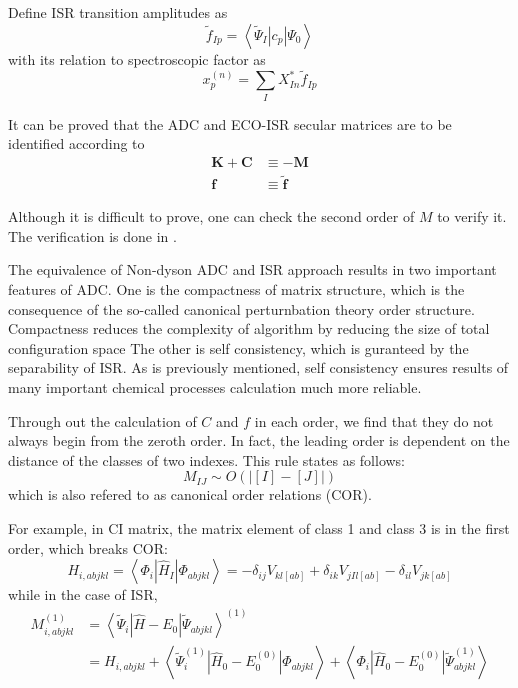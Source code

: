 \documentclass[bachelor, english]{ustcthesis}
\begin{document}
Define ISR transition amplitudes as
\begin{equation}
	\tilde{f}_{I p}=\left\langle\tilde{\Psi}_{I}\left|c_{p}\right| \Psi_{0}\right\rangle
\end{equation}
with its relation to spectroscopic factor as
\begin{equation}
	x_{p}^{(n)}=\sum_{I} X_{I n}^{*} \tilde{f}_{I p}
\end{equation}

It can be proved that the ADC and ECO-ISR secular matrices are to be identified according to
\begin{equation}
	\begin{aligned} \boldsymbol{K}+\boldsymbol{C} & \equiv-\boldsymbol{M} \\ \boldsymbol{f} & \equiv \tilde{\boldsymbol{f}} \end{aligned}
\end{equation}

Although it is difficult to prove, one can check the second order of $M$ to verify it.
The verification is done in \cite{main}.

The equivalence of Non-dyson ADC and ISR approach results in two important features of ADC.
One is the compactness of matrix structure, which is the consequence of the so-called canonical perturnbation theory order structure.
Compactness reduces the complexity of algorithm by reducing the size of total configuration space
The other is self consistency, which is guranteed by the separability of ISR.
As is previously mentioned, self consistency ensures results of many important chemical processes calculation much more reliable.

Through out the calculation of $C$ and $f$ in each order, we find that they do not always begin from the zeroth order.
In fact, the leading order is dependent on the distance of the classes of two  indexes.
This rule states as follows:
\begin{equation}
	M_{I J} \sim O( | [I]-[J] | )
\end{equation}
which is also refered to as canonical order relations (COR).

For example, in CI matrix, the matrix element of class 1 and class 3 is in the first order, which breaks COR:
\begin{equation}
	H_{i, a b j k l}=\left\langle\Phi_{i}\left|\hat{H}_{I}\right| \Phi_{a b j k l}\right\rangle=-\delta_{i j} V_{k l[a b]}+\delta_{i k} V_{j I l[a b]}-\delta_{i l} V_{j k[a b]}
\end{equation}
while in the case of ISR,
\begin{equation}
	\begin{aligned} M_{i, a b j k l}^{(1)} &=\left\langle\tilde{\Psi}_{i}\left|\hat{H}-E_{0}\right| \tilde{\Psi}_{a b j k l}\right\rangle^{(1)} \\ &=H_{i, a b j k l}+\left\langle\tilde{\Psi}_{i}^{(1)}\left|\hat{H}_{0}-E_{0}^{(0)}\right| \Phi_{a b j k l}\right\rangle+\left\langle\Phi_{i}\left|\hat{H}_{0}-E_{0}^{(0)}\right| \tilde{\Psi}_{a b j k l}^{(1)}\right\rangle \end{aligned}
\end{equation}
\end{document}
